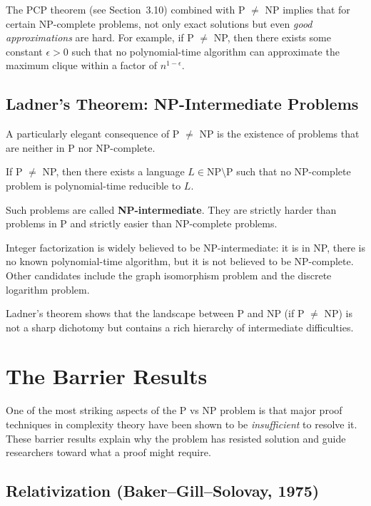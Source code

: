 The PCP theorem (see Section~3.10) combined with P $\neq$ NP implies that for certain NP-complete problems, not only exact solutions but even \emph{good approximations} are hard. For example, if P $\neq$ NP, then there exists some constant $\epsilon > 0$ such that no polynomial-time algorithm can approximate the maximum clique within a factor of $n^{1-\epsilon}$.

\subsection{Ladner's Theorem: NP-Intermediate Problems}

A particularly elegant consequence of P $\neq$ NP is the existence of problems that are neither in P nor NP-complete.

\begin{theorem}[Ladner, 1975]
If P $\neq$ NP, then there exists a language $L \in \text{NP} \setminus \text{P}$ such that no NP-complete problem is polynomial-time reducible to $L$.
\end{theorem}

Such problems are called \textbf{NP-intermediate}. They are strictly harder than problems in P and strictly easier than NP-complete problems.

\begin{remark}
Integer factorization is widely believed to be NP-intermediate: it is in NP, there is no known polynomial-time algorithm, but it is not believed to be NP-complete. Other candidates include the graph isomorphism problem and the discrete logarithm problem.
\end{remark}

Ladner's theorem shows that the landscape between P and NP (if P $\neq$ NP) is not a sharp dichotomy but contains a rich hierarchy of intermediate difficulties.

\section{The Barrier Results}

One of the most striking aspects of the P vs NP problem is that major proof techniques in complexity theory have been shown to be \emph{insufficient} to resolve it. These barrier results explain why the problem has resisted solution and guide researchers toward what a proof might require.

\subsection{Relativization (Baker--Gill--Solovay, 1975)}

